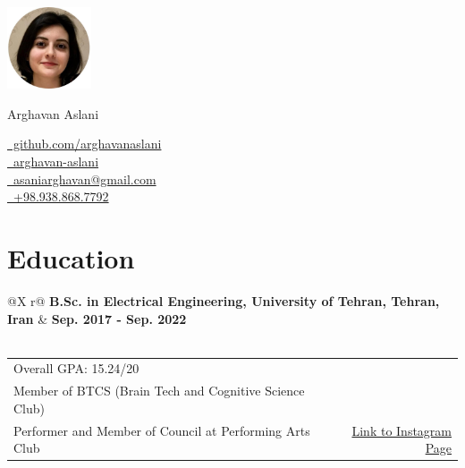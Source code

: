 \documentclass[a4paper,12pt]{article}
\begin{document}
\pagestyle{empty} 


\begin{minipage}[c]{2.5cm}
    \includegraphics[width=2.5cm]{./avatar/avatar4.jpg}
\end{minipage}%
\hspace{1em}
\begin{minipage}[c]{\dimexpr\linewidth-2.5cm-15em\relax}
    \Huge{Arghavan Aslani}
\end{minipage}%
\begin{minipage}[c]{0.3\linewidth}
    \href{https://github.com/arghavanaslani}{\raisebox{-0.05\height}\faGithub\ github.com/arghavanaslani} \\ 
    \href{https://www.linkedin.com/in/arghavan-aslani/}{\raisebox{-0.05\height}\faLinkedin\ arghavan-aslani} \\ 
    \href{mailto:aslaniarghavan@gmail.com}{\raisebox{-0.05\height}\faEnvelope \ asaniarghavan@gmail.com} \\ 
    \href{tel:+989388687792}{\raisebox{-0.05\height}\faMobile \ +98.938.868.7792}
\end{minipage}

\section{Education}
\begin{tabularx}{\linewidth}{@{}X r@{}}
    \textbf{B.Sc. in Electrical Engineering, University of Tehran, Tehran, Iran} & \textbf{Sep. 2017 - Sep. 2022} \\
     \\
\end{tabularx}

\begin{tabularx}{\linewidth}{@{}X r@{}}
    {Overall GPA: 15.24/20} & \hfill \href{}{} \\[3.75pt]
    {Member of BTCS (Brain Tech and Cognitive Science Club)} & \hfill \href{}{} \\[3.75pt]
    {Performer and Member of Council at Performing Arts Club} & \hfill \href{https://www.instagram.com/fanni_theater/}{Link to Instagram Page} \\[3.75pt]
\end{tabularx}
\end{document}
